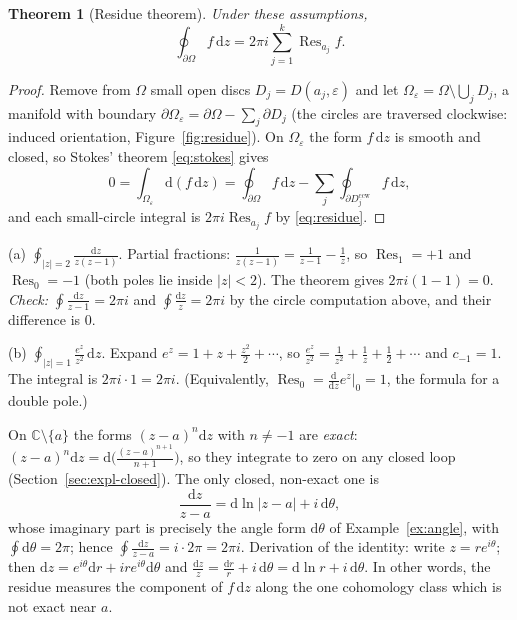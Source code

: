 \documentclass[11pt,a4paper]{article}
\newcounter{thm}[section]
\numberwithin{equation}{section}
\theoremstyle{definition}
\theoremstyle{plain}
\newtheorem{theorem}[thm]{Theorem}
\newcommand{\C}{\mathbb{C}}
\newcommand{\dd}{\mathrm{d}}
\newcommand{\Res}{\operatorname{Res}}
\begin{document}
\begin{theorem}[Residue theorem]\label{thm:residue}
Under these assumptions,
\[
\oint_{\partial\Omega}f\,\dd z=2\pi i\sum_{j=1}^k\Res_{a_j}f .
\]
\end{theorem}
\begin{proof}
Remove from $\Omega$ small open discs $D_j=D(a_j,\varepsilon)$ and let $\Omega_\varepsilon=\Omega\setminus\bigcup_jD_j$, a manifold with boundary $\partial\Omega_\varepsilon=\partial\Omega-\sum_j\partial D_j$ (the circles are traversed clockwise: induced orientation, Figure~\ref{fig:residue}). On $\Omega_\varepsilon$ the form $f\,\dd z$ is smooth and closed, so Stokes' theorem \eqref{eq:stokes} gives
\[
0=\int_{\Omega_\varepsilon}\dd(f\,\dd z)=\oint_{\partial\Omega}f\,\dd z-\sum_j\oint_{\partial D_j^{\mathrm{ccw}}}f\,\dd z,
\]
and each small-circle integral is $2\pi i\Res_{a_j}f$ by \eqref{eq:residue}.
\end{proof}

\begin{example}\label{ex:residues}
(a) $\displaystyle\oint_{|z|=2}\frac{\dd z}{z(z-1)}$. Partial fractions: $\frac1{z(z-1)}=\frac1{z-1}-\frac1z$, so $\Res_1=+1$ and $\Res_0=-1$ (both poles lie inside $|z|<2$). The theorem gives $2\pi i(1-1)=0$.
\emph{Check:} $\oint\frac{\dd z}{z-1}=2\pi i$ and $\oint\frac{\dd z}z=2\pi i$ by the circle computation above, and their difference is $0$.

(b) $\displaystyle\oint_{|z|=1}\frac{e^z}{z^2}\,\dd z$. Expand $e^z=1+z+\frac{z^2}2+\cdots$, so $\frac{e^z}{z^2}=\frac1{z^2}+\frac1z+\frac12+\cdots$ and $c_{-1}=1$. The integral is $2\pi i\cdot1=2\pi i$. (Equivalently, $\Res_0=\frac{\dd}{\dd z}e^z\big|_0=1$, the formula for a double pole.)
\end{example}

\begin{keyidea}
On $\C\setminus\{a\}$ the forms $(z-a)^n\dd z$ with $n\neq-1$ are \emph{exact}: $(z-a)^n\dd z=\dd\bigl(\frac{(z-a)^{n+1}}{n+1}\bigr)$, so they integrate to zero on any closed loop (Section~\ref{sec:expl-closed}). The only closed, non-exact one is
\begin{equation}\label{eq:dzoverz}
\frac{\dd z}{z-a}=\dd\ln|z-a|+i\,\dd\theta,
\end{equation}
whose imaginary part is precisely the angle form $\dd\theta$ of Example~\ref{ex:angle}, with $\oint\dd\theta=2\pi$; hence $\oint\frac{\dd z}{z-a}=i\cdot2\pi=2\pi i$. Derivation of the identity: write $z=re^{i\theta}$; then $\dd z=e^{i\theta}\dd r+ire^{i\theta}\dd\theta$ and $\frac{\dd z}z=\frac{\dd r}r+i\,\dd\theta=\dd\ln r+i\,\dd\theta$.
In other words, the residue measures the component of $f\,\dd z$ along the one cohomology class which is not exact near $a$.
\end{keyidea}
\end{document}
